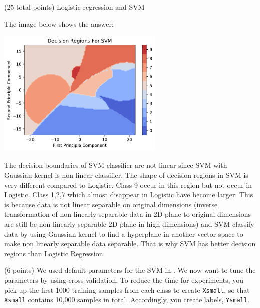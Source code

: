 \documentclass[12pt]{article}
\begin{document}
\begin{question}{(25 total points) Logistic regression and SVM}
\begin{subquestion}
      \begin{answerbox}{35em}
         The image below shows the answer:
         \begin{center}
         \includegraphics[width=0.6\textwidth]{DR2.pdf}
         \end{center}
         The decision boundaries of SVM classifier are not linear since SVM with Gaussian kernel is non linear classifier. The shape of decision regions in SVM is very different compared to Logistic. Class 9 occur in this region but not occur in Logistic. Class 1,2,7 which almost disappear in Logistic have become larger. This is because data is not linear separable on original dimensions (inverse transformation of non linearly separable data in 2D plane to original dimensions are still be non linearly separable 2D plane in high dimensions) and SVM classify data by using Gaussian kernel to find a hyperplane in another vector space to make non linearly separable data separable. That is why SVM has better decision regions than Logistic Regression.
      \end{answerbox}
  


   \end{subquestion}

   \begin{subquestion}{(6 points)
       We used default parameters for the SVM in .
       We now want to tune the parameters by using cross-validation.
       To reduce the time for experiments, you pick up the first 1000
       training samples from each class to create \texttt{Xsmall}, so that \texttt{Xsmall}
       contains 10,000 samples in total. Accordingly, you create
       labels, \texttt{Ysmall}.
     } \label{Q2.5}


   


\end{subquestion}
\end{question}
\end{document}
